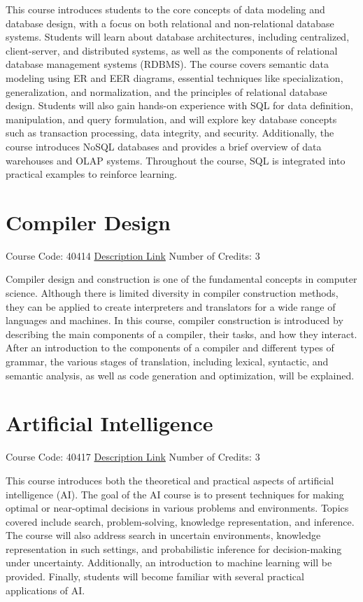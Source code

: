 \documentclass[
fontsize=11pt,
paper=a4,
parskip=half,
enlargefirstpage=off,    %
fromalign=right,        %
fromphone=on,           %
fromemail=on,
fromrule=off,           %
addrfield=off,          %
backaddress=on,         %
subject=beforeopening,  %
locfield=narrow,        %
foldmarks=off,          %
open=any
]{scrartcl}
\begin{document}
This course introduces students to the core concepts of data modeling and database design, with a focus on both relational and non-relational database systems. Students will learn about database architectures, including centralized, client-server, and distributed systems, as well as the components of relational database management systems (RDBMS). The course covers semantic data modeling using ER and EER diagrams, essential techniques like specialization, generalization, and normalization, and the principles of relational database design. Students will also gain hands-on experience with SQL for data definition, manipulation, and query formulation, and will explore key database concepts such as transaction processing, data integrity, and security. Additionally, the course introduces NoSQL databases and provides a brief overview of data warehouses and OLAP systems. Throughout the course, SQL is integrated into practical examples to reinforce learning.

\section{Compiler Design}
Course Code: 40414 \qquad \quad \href{https://docs.ce.sharif.edu/course/40414}{Description Link}
\qquad \quad Number of Credits: 3

Compiler design and construction is one of the fundamental concepts in computer science. Although there is limited diversity in compiler construction methods, they can be applied to create interpreters and translators for a wide range of languages and machines. In this course, compiler construction is introduced by describing the main components of a compiler, their tasks, and how they interact. After an introduction to the components of a compiler and different types of grammar, the various stages of translation, including lexical, syntactic, and semantic analysis, as well as code generation and optimization, will be explained.


\section{Artificial Intelligence}
Course Code: 40417 \qquad \quad \href{https://docs.ce.sharif.edu/course/40417}{Description Link}
\qquad \quad Number of Credits: 3

This course introduces both the theoretical and practical aspects of artificial intelligence (AI). The goal of the AI course is to present techniques for making optimal or near-optimal decisions in various problems and environments. Topics covered include search, problem-solving, knowledge representation, and inference. The course will also address search in uncertain environments, knowledge representation in such settings, and probabilistic inference for decision-making under uncertainty. Additionally, an introduction to machine learning will be provided. Finally, students will become familiar with several practical applications of AI.
\end{document}
